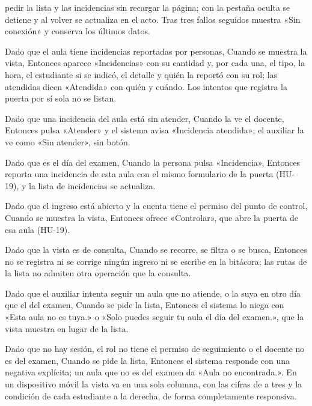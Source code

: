 {      pedir la lista y las incidencias sin recargar la página; con la pestaña oculta se
      detiene y al volver se actualiza en el acto. Tras tres fallos seguidos muestra «Sin
      conexión» y conserva los últimos datos.
\item Dado que el aula tiene incidencias reportadas por personas, Cuando se muestra la
      vista, Entonces aparece «Incidencias» con su cantidad y, por cada una, el tipo, la
      hora, el estudiante si se indicó, el detalle y quién la reportó con su rol; las
      atendidas dicen «Atendida» con quién y cuándo. Los intentos que registra la puerta
      por sí sola no se listan.
\item Dado que una incidencia del aula está sin atender, Cuando la ve el docente,
      Entonces pulsa «Atender» y el sistema avisa «Incidencia atendida»; el auxiliar la
      ve como «Sin atender», sin botón.
\item Dado que es el día del examen, Cuando la persona pulsa «Incidencia», Entonces
      reporta una incidencia de esta aula con el mismo formulario de la puerta (HU-19), y
      la lista de incidencias se actualiza.
\item Dado que el ingreso está abierto y la cuenta tiene el permiso del punto de
      control, Cuando se muestra la vista, Entonces ofrece «Controlar», que abre la
      puerta de esa aula (HU-19).
\item Dado que la vista es de consulta, Cuando se recorre, se filtra o se busca,
      Entonces no se registra ni se corrige ningún ingreso ni se escribe en la bitácora;
      las rutas de la lista no admiten otra operación que la consulta.
\item Dado que el auxiliar intenta seguir un aula que no atiende, o la suya en otro día
      que el del examen, Cuando se pide la lista, Entonces el sistema lo niega con «Esta
      aula no es tuya.» o «Solo puedes seguir tu aula el día del examen.», que la vista
      muestra en lugar de la lista.
\item Dado que no hay sesión, el rol no tiene el permiso de seguimiento o el docente no
      es del examen, Cuando se pide la lista, Entonces el sistema responde con una
      negativa explícita; un aula que no es del examen da «Aula no encontrada.». En un
      dispositivo móvil la vista va en una sola columna, con las cifras de a tres y la
      condición de cada estudiante a la derecha, de forma completamente responsiva.}

